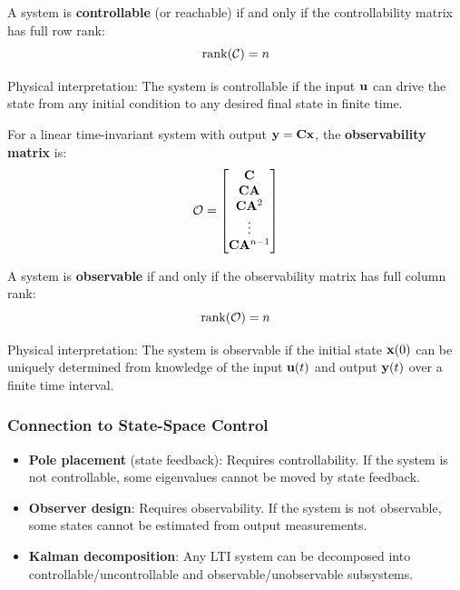 \begin{keyconceptbox}[title=Controllability Condition]
A system is \textbf{controllable} (or reachable) if and only if the controllability matrix has full row rank:
\[
\operatorname{rank}(\mathcal{C}) = n
\]

Physical interpretation: The system is controllable if the input $\mathbf{u}$ can drive the state from any initial condition to any desired final state in finite time.
\end{keyconceptbox}

\begin{definitionbox}[title=Definition 0.8: Observability Matrix]
For a linear time-invariant system with output $\mathbf{y} = \mathbf{C}\mathbf{x}$, the \textbf{observability matrix} is:
\begin{equation}
\mathcal{O} = \begin{bmatrix} \mathbf{C} \\ \mathbf{C}\mathbf{A} \\ \mathbf{C}\mathbf{A}^2 \\ \vdots \\ \mathbf{C}\mathbf{A}^{n-1} \end{bmatrix}
\end{equation}
\end{definitionbox}

\begin{keyconceptbox}[title=Observability Condition]
A system is \textbf{observable} if and only if the observability matrix has full column rank:
\[
\operatorname{rank}(\mathcal{O}) = n
\]

Physical interpretation: The system is observable if the initial state $\mathbf{x}(0)$ can be uniquely determined from knowledge of the input $\mathbf{u}(t)$ and output $\mathbf{y}(t)$ over a finite time interval.
\end{keyconceptbox}

\subsubsection{Connection to State-Space Control}

\begin{warningbox}[title=Importance for Control Design]
\begin{itemize}
    \item \textbf{Pole placement} (state feedback): Requires controllability. If the system is not controllable, some eigenvalues cannot be moved by state feedback.
    \item \textbf{Observer design}: Requires observability. If the system is not observable, some states cannot be estimated from output measurements.
    \item \textbf{Kalman decomposition}: Any LTI system can be decomposed into controllable/uncontrollable and observable/unobservable subsystems.
\end{itemize}
\end{warningbox}

